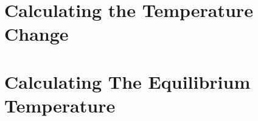 \appendix
{}
\section*{Calculating the Temperature Change}

\section*{Calculating The Equilibrium Temperature}